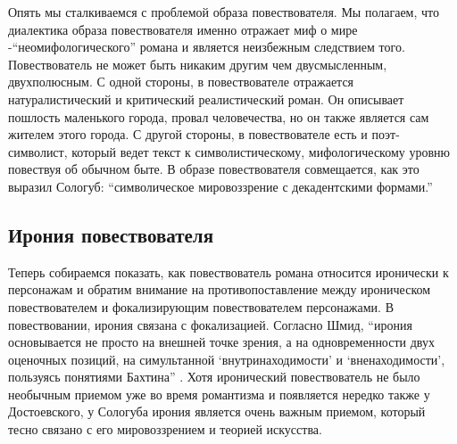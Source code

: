 \documentclass[12pt,a4paper]{article}
\begin{document}
Опять мы сталкиваемся с проблемой образа повествователя. Мы полагаем, что диалектика образа повествователя именно отражает миф о мире -\enquote{неомифологического} романа и является неизбежным следствием того. Повествователь не может быть никаким другим чем двусмысленным, двухполюсным. С одной стороны, в повествователе отражается натуралистический и критический реалистический роман. Он описывает пошлость маленького города, провал человечества, но он также является сам жителем этого города. С другой стороны, в повествователе есть и поэт-символист, который ведет текст к символистическому, мифологическому уровню повествуя об обычном быте. В образе повествователя совмещается, как это выразил Сологуб: \enquote{символическое мировоззрение с декадентскими формами.} %











\subsection{Ирония повествователя}



Теперь собираемся показать, как повествователь романа относится иронически к персонажам и обратим внимание на противопоставление между ироническом повествователем и фокализирующим повествователем персонажами. В повествовании, ирония связана с фокализацией. Согласно Шмид, \enquote{ирония основывается не просто на внешней точке зрения, а на одновременности двух оценочных позиций, на симультанной \enquote{внутринаходимости} и \enquote{вненаходимости}, пользуясь понятиями Бахтина} \parencite[118]{schmid2008}.  Хотя иронический повествователь не было необычным приемом уже во время романтизма и появляется нередко также у Достоевского, у Сологуба ирония является очень важным приемом, который тесно связано с его мировоззрением и теорией искусства.
\end{document}
